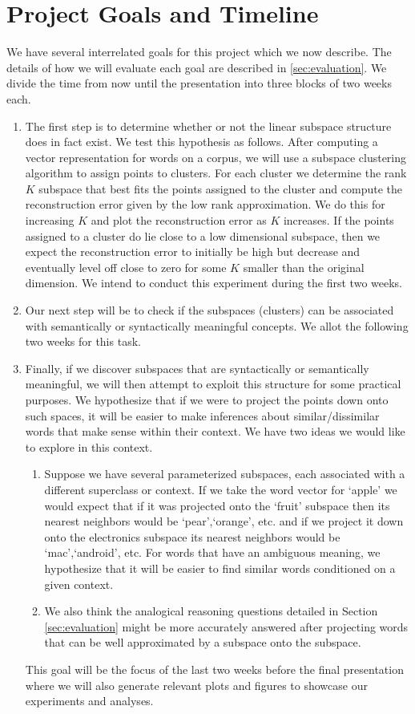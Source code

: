 \section{Project Goals and Timeline}\label{sec:timeline}

We have several interrelated goals for this project which we now describe. 
The details of how we will evaluate each goal are described in \ref{sec:evaluation}.
We divide the time from now until the presentation into three blocks of two weeks each.
 \begin{enumerate}
\item The first step is to determine whether or not the linear subspace structure does in fact exist. 
We test this hypothesis as follows. 
 After computing a vector representation for words on a corpus, we will use a subspace clustering algorithm to assign points to clusters. 
For each cluster we determine the rank $K$ subspace that best fits the points assigned to the cluster and compute the reconstruction error given by the low rank approximation. 
We do this for increasing $K$ and plot the reconstruction error as $K$ increases. 
If the points assigned to a cluster do lie close to a low dimensional subspace, then we expect the reconstruction error to initially be high but decrease and eventually level off close to zero for some $K$ smaller than the original dimension. 
We intend to conduct this experiment during the first two weeks.
 
\item Our next step will be to check if the subspaces (clusters) can be associated with semantically or syntactically meaningful concepts.
We allot the following two weeks for this task. 

\item Finally, if we discover subspaces that are syntactically or semantically meaningful, we will then attempt to exploit this structure for some practical purposes. 
We hypothesize that if we were to project the points down onto such spaces, it will be easier to make inferences about similar/dissimilar words that make sense within their context. We have two ideas we would like to explore in this context. 
	\begin{enumerate}
		\item Suppose we have several parameterized subspaces, each associated with a different superclass or context. 
If we take the word vector for `apple' we would expect that if it was projected onto the `fruit' subspace then its nearest neighbors would be `pear',`orange', etc. and if we project it down onto the electronics subspace its nearest neighbors would be `mac',`android', etc. 
For words that have an ambiguous meaning,  we hypothesize that it will be easier to find similar words conditioned on a given context. 
		\item We also think the analogical reasoning questions detailed in Section \ref{sec:evaluation} might be more accurately answered after projecting words that can be well approximated by a subspace onto the subspace. 
	\end{enumerate} 
	
This goal will be the focus of the last two weeks before the final presentation where we will also generate relevant plots and figures to showcase our experiments and analyses.
\end{enumerate}
